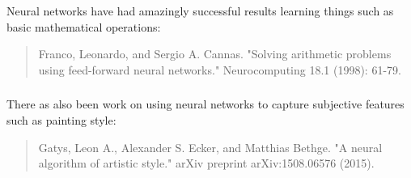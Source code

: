 \documentclass[xetex,mathserif,serif,aspectratio=169]{beamer}
\begin{document}
\begin{frame}[fragile] \frametitle{} \oldB \large

\begin{center}
 \\
 \\
\end{center}

\end{frame}

\begin{frame}[fragile] \frametitle{} \oldB \small

Neural networks have had amazingly successful results
learning things such as basic mathematical operations:
\begin{quote}
Franco, Leonardo, and Sergio A. Cannas. "Solving arithmetic problems using feed-forward neural networks." Neurocomputing 18.1 (1998): 61-79.
\end{quote}

\end{frame}

\begin{frame}[fragile] \frametitle{} \oldB \large

\begin{center}
\end{center}

\end{frame}

\begin{frame}[fragile] \frametitle{} \oldB \small

There as also been work on using neural networks to
capture subjective features such as painting style:
\begin{quote}
Gatys, Leon A., Alexander S. Ecker, and Matthias Bethge.
"A neural algorithm of artistic style." arXiv preprint
arXiv:1508.06576 (2015).
\end{quote}

\end{frame}
\end{document}
